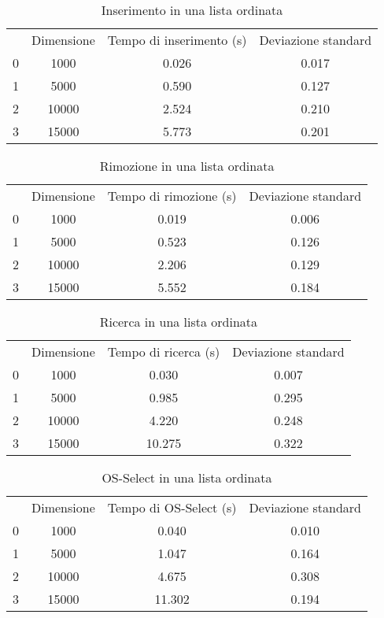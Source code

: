 \begin{table}[H]
\centering
\caption{Inserimento in una lista ordinata}
\label{Inserimento in una lista ordinata}
\begin{tabular}{cccc}
 & Dimensione & Tempo di inserimento (s) & Deviazione standard \\
0 & 1000 & 0.026 & 0.017 \\
\cline{1-4}
1 & 5000 & 0.590 & 0.127 \\
\cline{1-4}
2 & 10000 & 2.524 & 0.210 \\
\cline{1-4}
3 & 15000 & 5.773 & 0.201 \\
\cline{1-4}
\end{tabular}
\end{table}

\begin{table}[H]
\centering
\caption{Rimozione in una lista ordinata}
\label{Rimozione in una lista ordinata}
\begin{tabular}{cccc}
 & Dimensione & Tempo di rimozione (s) & Deviazione standard \\
0 & 1000 & 0.019 & 0.006 \\
\cline{1-4}
1 & 5000 & 0.523 & 0.126 \\
\cline{1-4}
2 & 10000 & 2.206 & 0.129 \\
\cline{1-4}
3 & 15000 & 5.552 & 0.184 \\
\cline{1-4}
\end{tabular}
\end{table}

\begin{table}[H]
\centering
\caption{Ricerca in una lista ordinata}
\label{Ricerca in una lista ordinata}
\begin{tabular}{cccc}
 & Dimensione & Tempo di ricerca (s) & Deviazione standard \\
0 & 1000 & 0.030 & 0.007 \\
\cline{1-4}
1 & 5000 & 0.985 & 0.295 \\
\cline{1-4}
2 & 10000 & 4.220 & 0.248 \\
\cline{1-4}
3 & 15000 & 10.275 & 0.322 \\
\cline{1-4}
\end{tabular}
\end{table}

\begin{table}[H]
\centering
\caption{OS-Select in una lista ordinata}
\label{OS-Select in una lista ordinata}
\begin{tabular}{cccc}
 & Dimensione & Tempo di OS-Select (s) & Deviazione standard \\
0 & 1000 & 0.040 & 0.010 \\
\cline{1-4}
1 & 5000 & 1.047 & 0.164 \\
\cline{1-4}
2 & 10000 & 4.675 & 0.308 \\
\cline{1-4}
3 & 15000 & 11.302 & 0.194 \\
\cline{1-4}
\end{tabular}
\end{table}

